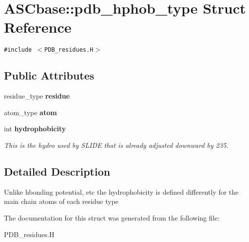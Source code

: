 \section{ASCbase::pdb\_\-hphob\_\-type Struct Reference}
\label{structASCbase_1_1pdb__hphob__type}
{\tt \#include $<$PDB\_\-residues.H$>$}

\subsection*{Public Attributes}
\begin{CompactItemize}
\item 
residue\_\-type \textbf{residue}\label{structASCbase_1_1pdb__hphob__type_b2d56532756a4855bffb768a22df0bd3}

\item 
atom\_\-type \textbf{atom}\label{structASCbase_1_1pdb__hphob__type_450d8d9410b599b3c50ded60ded76535}

\item 
int \bf{hydrophobicity}\label{structASCbase_1_1pdb__hphob__type_a159bae42d7108f85a2b1067fae5a251}

\begin{CompactList}\small\item\em This is the hydro used by SLIDE that is already adjusted downward by 235. \item\end{CompactList}\end{CompactItemize}


\subsection{Detailed Description}
Unlike hbonding potential, etc the hydrophobicity is defined differently for the main chain atoms of each residue type 



The documentation for this struct was generated from the following file:\begin{CompactItemize}
\item 
PDB\_\-residues.H\end{CompactItemize}
